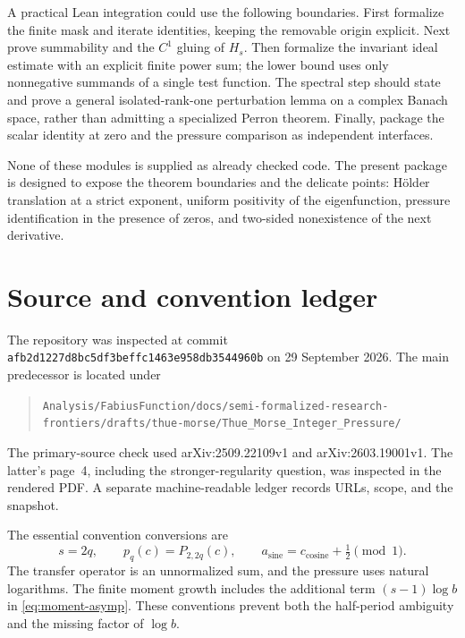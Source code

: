 \documentclass[11pt,a4paper]{article}
\numberwithin{equation}{section}
\theoremstyle{definition}
\theoremstyle{remark}
\begin{document}
A practical Lean integration could use the following boundaries.
First formalize the finite mask and iterate identities, keeping the
removable origin explicit. Next prove summability and the $C^1$ gluing
of $H_s$. Then formalize the invariant ideal estimate with an explicit
finite power sum; the lower bound uses only nonnegative summands of a
single test function. The spectral step should state and prove a general
isolated-rank-one perturbation lemma on a complex Banach space, rather
than admitting a specialized Perron theorem. Finally, package the scalar
identity at zero and the pressure comparison as independent interfaces.

None of these modules is supplied as already checked code. The present
package is designed to expose the theorem boundaries and the delicate
points: H\"older translation at a strict exponent, uniform positivity of
the eigenfunction, pressure identification in the presence of zeros, and
two-sided nonexistence of the next derivative.

\section{Source and convention ledger}
\label{app:sources}
The repository was inspected at commit
\nolinkurl{afb2d1227d8bc5df3beffc1463e958db3544960b} on 29 September
2026. The main predecessor is located under
\begin{quote}\small\raggedright
\nolinkurl{Analysis/FabiusFunction/docs/semi-formalized-research-frontiers/drafts/thue-morse/Thue_Morse_Integer_Pressure/}
\end{quote}
The primary-source check used arXiv:2509.22109v1 and
arXiv:2603.19001v1. The latter's page~4, including the stronger-regularity
question, was inspected in the rendered PDF. A separate machine-readable
ledger records URLs, scope, and the snapshot.

The essential convention conversions are
\[
 s=2q,\qquad p_q(c)=P_{2,2q}(c),\qquad
 a_{\mathrm{sine}}=c_{\mathrm{cosine}}+\tfrac12\pmod1.
\]
The transfer operator is an unnormalized sum, and the pressure uses
natural logarithms. The finite moment growth includes the additional
term $(s-1)\log b$ in \cref{eq:moment-asymp}. These conventions prevent
both the half-period ambiguity and the missing factor of $\log b$.
\end{document}
